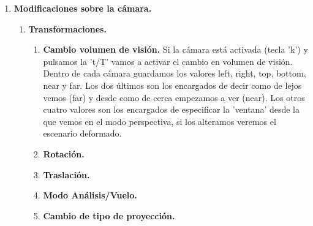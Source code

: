 \documentclass[12pt,a4paper]{article}
\begin{document}
\begin{enumerate}
\item \textbf{Modificaciones sobre la cámara.}\newline
\begin{enumerate}
\item \textbf{Transformaciones.}

\begin{enumerate}
\item \textbf{Cambio volumen de visión.}
Si la cámara está activada (tecla 'k') y pulsamos la 't/T' vamos a activar el cambio en volumen de visión.\newline
Dentro de cada cámara guardamos los valores left, right, top, bottom, near y far. Los dos últimos son los encargados de decir como de lejos vemos (far) y desde como de cerca empezamos a ver (near). Los otros cuatro valores son los encargados de especificar la 'ventana' desde la que vemos en el modo perspectiva, si los alteramos veremos el escenario deformado.\newline
\item \textbf{Rotación.}
\item \textbf{Traslación.}
\item \textbf{Modo Análisis/Vuelo.}
\item \textbf{Cambio de tipo de proyección.}

\end{enumerate}%
\end{enumerate}%



\end{enumerate}
\end{document}
